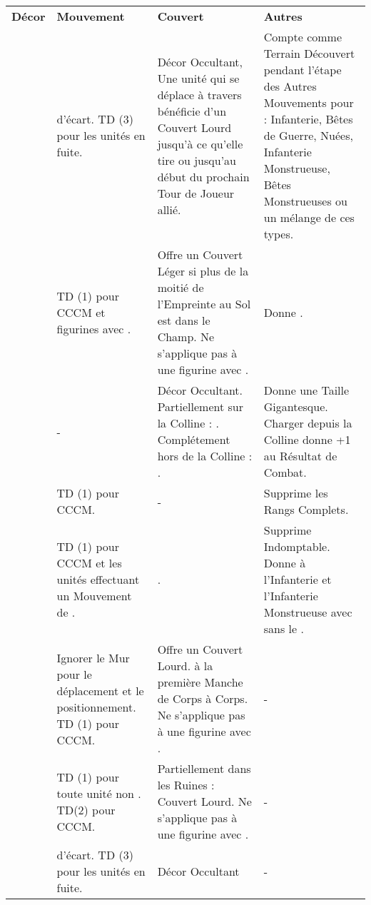 {\vspace*{-5pt}
\begin{center}
\begin{tabular}{@{}>{\bfseries}M{2cm}M{3.8cm}M{5.3cm}M{5.3cm}}
\textbf{Décor} & \textbf{Mouvement} & \textbf{Couvert} & \textbf{Autres} \tabularnewline
{} &
 d'écart.\newline
TD (3) pour les unités en fuite. &
Décor Occultant, \hardterrain{}\newline
Une unité qui se déplace à travers bénéficie d'un Couvert Lourd jusqu'à ce qu'elle tire ou jusqu'au début du prochain Tour de Joueur allié. &
Compte comme Terrain Découvert pendant l'étape des Autres Mouvements pour : Infanterie, Bêtes de Guerre, Nuées, Infanterie Monstrueuse, Bêtes Monstrueuses ou un mélange de ces types. \tabularnewline
{} &
TD (1) pour CCCM et figurines avec \flamingattacks{}. &
Offre un Couvert Léger si plus de la moitié de l'Empreinte au Sol est dans le Champ. Ne s'applique pas à une figurine avec \toweringpresence{}. &
Donne \flammable{}. \tabularnewline
{} &
- &
Décor Occultant.\newline
Partiellement sur la Colline : \softterrain{}.\newline
Complétement hors de la Colline : \hardterrain{}.&
Donne une Taille Gigantesque.\newline
Charger depuis la Colline donne +1 au Résultat de Combat. \tabularnewline
{} &
TD (1) pour CCCM. &
- &
Supprime les Rangs Complets.\tabularnewline
{} &
TD (1) pour CCCM et les unités effectuant un Mouvement de \fly{}. &
\softterrain{}. &
Supprime Indomptable. Donne \stubborn{} à l'Infanterie et l'Infanterie Monstrueuse avec \lighttroops{} sans le \fly{}.\tabularnewline
{} &
Ignorer le Mur pour le déplacement et le positionnement. TD (1) pour CCCM. &
Offre un Couvert Lourd. \distracting{} à la première Manche de Corps à Corps. Ne s'applique pas à une figurine avec \toweringpresence{}. &
- \tabularnewline
{} &
TD (1) pour toute unité non \skirmisher{}. TD(2) pour CCCM. &
Partiellement dans les Ruines : Couvert Lourd. Ne s'applique pas à une figurine avec \toweringpresence{}. &
- \tabularnewline
{} &
 d'écart.\newline
TD (3) pour les unités en fuite. &
Décor Occultant\newline
\hardterrain{} &
- \tabularnewline
\end{tabular}
\end{center}

}
